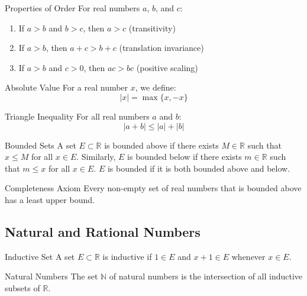 \begin{theorembox}{Properties of Order}
For real numbers $a$, $b$, and $c$:
\begin{enumerate}[label=(\roman*)]
\item If $a > b$ and $b > c$, then $a > c$ (transitivity)
\item If $a > b$, then $a + c > b + c$ (translation invariance)
\item If $a > b$ and $c > 0$, then $ac > bc$ (positive scaling)
\end{enumerate}
\end{theorembox}

\begin{definitionbox}{Absolute Value}
For a real number $x$, we define:
\[ |x| = \max\{x,-x\} \]
\end{definitionbox}

\begin{theorembox}{Triangle Inequality}
For all real numbers $a$ and $b$:
\[ |a + b| \leq |a| + |b| \]
\end{theorembox}

\begin{definitionbox}{Bounded Sets}
A set $E \subset \mathbb{R}$ is bounded above if there exists $M \in \mathbb{R}$ such that $x \leq M$ for all $x \in E$.
Similarly, $E$ is bounded below if there exists $m \in \mathbb{R}$ such that $m \leq x$ for all $x \in E$.
$E$ is bounded if it is both bounded above and below.
\end{definitionbox}

\begin{theorembox}{Completeness Axiom}
Every non-empty set of real numbers that is bounded above has a least upper bound.
\end{theorembox}

\subsection{Natural and Rational Numbers}

\begin{definitionbox}{Inductive Set}
A set $E \subset \mathbb{R}$ is inductive if $1 \in E$ and $x + 1 \in E$ whenever $x \in E$.
\end{definitionbox}

\begin{definitionbox}{Natural Numbers}
The set $\mathbb{N}$ of natural numbers is the intersection of all inductive subsets of $\mathbb{R}$.
\end{definitionbox}

